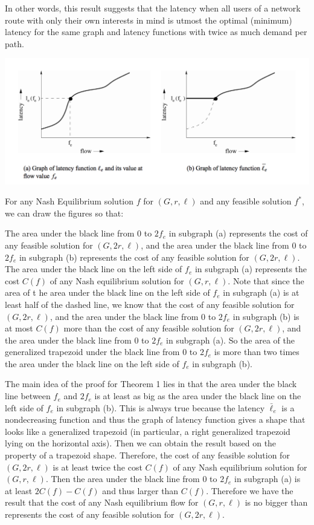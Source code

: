 \begin{proof-sketch}
    In other words, this result suggests that the latency when all users of a network route with only their own interests in mind is utmost the optimal (minimum) latency for the same graph and latency functions
    with twice as much demand per path. 
    
    \includegraphics[width=1\textwidth]{graph}

    For any Nash Equilibrium solution $f$ for $(G, r, \ell)$ and any feasible solution $f^*$, we can draw the figures so that:
    
    The area under the black line from $0$ to $2f_e$ in subgraph (a) represents the cost of any feasible solution for $(G, 2r, \ell)$, and the area under the black line from $0$ to $2f_e$ in subgraph (b) represents the cost of any feasible solution for $(G, 2r, \ell)$. The area under the black line on the left side of $f_e$ in subgraph (a) represents the cost $C(f)$ of any Nash equilibrium solution for $(G, r, \ell)$. Note that since the area of t he area under the black line on the left side of $f_e$ in subgraph (a) is at least half of the dashed line, we know that the cost of any feasible solution for $(G, 2r, \ell)$, and the area under the black line from $0$ to $2f_e$ in subgraph (b) is at most $C(f)$ more than the cost of any feasible solution for $(G, 2r, \ell)$, and the area under the black line from $0$ to $2f_e$ in subgraph (a). So the area of the generalized trapezoid under the black line from $0$ to $2f_e$ is more than two times the area under the black line on the left side of $f_e$ in subgraph (b).
    
    The main idea of the proof for Theorem 1 lies in that the area under the black line between $f_e$ and $2f_e$ is at least as big as the area under the black line on the left side of $f_e$ in subgraph (b). This is always true because the latency $\bar{\ell}_e$ is a nondecreasing function and thus the graph of latency function gives a shape that looks like a generalized trapezoid (in particular, a right generalized trapezoid lying on the horizontal axis). Then we can obtain the result based on the property of a trapezoid shape. Therefore, the cost of any feasible solution for $(G, 2r, \ell)$ is at least twice the cost $C(f)$ of any Nash equilibrium solution for $(G, r, \ell)$. Then the area under the black line from $0$ to $2f_e$ in subgraph (a) is at least $2C(f)-C(f)$ and thus larger than $C(f)$. Therefore we have the result that the cost of any Nash equilibrium flow for $(G, r, \ell)$ is no bigger than represents the cost of any feasible solution for $(G, 2r, \ell)$.
    
\end{proof-sketch}

